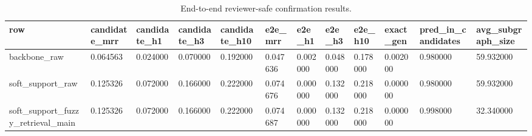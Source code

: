 \begin{table}[t]
\centering
\small
\begin{tabular}{llllllllllll}
\hline
row & candidate\_mrr & candidate\_h1 & candidate\_h3 & candidate\_h10 & e2e\_mrr & e2e\_h1 & e2e\_h3 & e2e\_h10 & exact\_gen & pred\_in\_candidates & avg\_subgraph\_size \\
\hline
backbone\_raw & 0.064563 & 0.024000 & 0.070000 & 0.192000 & 0.047636 & 0.002000 & 0.048000 & 0.178000 & 0.002000 & 0.980000 & 59.932000 \\
soft\_support\_raw & 0.125326 & 0.072000 & 0.166000 & 0.222000 & 0.074676 & 0.000000 & 0.132000 & 0.218000 & 0.000000 & 0.980000 & 59.932000 \\
soft\_support\_fuzzy\_retrieval\_main & 0.125326 & 0.072000 & 0.166000 & 0.222000 & 0.074687 & 0.000000 & 0.132000 & 0.218000 & 0.000000 & 0.998000 & 32.340000 \\
\hline
\end{tabular}
\caption{End-to-end reviewer-safe confirmation results.}
\label{tab:e2e-confirmation}
\end{table}
